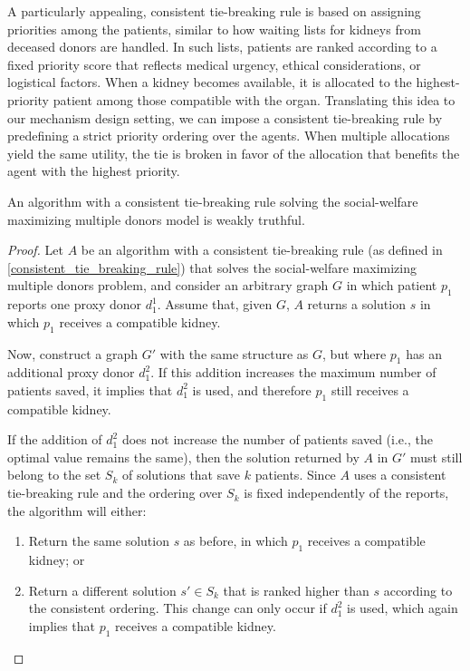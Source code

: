 A particularly appealing, consistent tie-breaking rule is based on assigning priorities among the patients, similar to how waiting lists for kidneys from deceased donors are handled. In such lists, patients are ranked according to a fixed priority score that reflects medical urgency, ethical considerations, or logistical factors. When a kidney becomes available, it is allocated to the highest-priority patient among those compatible with the organ. Translating this idea to our mechanism design setting, we can impose a consistent tie-breaking rule by predefining a strict priority ordering over the agents. When multiple allocations yield the same utility, the tie is broken in favor of the allocation that benefits the agent with the highest priority.

\begin{lemma}
    An algorithm with a consistent tie-breaking rule solving the social-welfare maximizing multiple donors model is weakly truthful.
    \begin{proof}
    Let $A$ be an algorithm with a consistent tie-breaking rule (as defined in \autoref{consistent_tie_breaking_rule}) that solves the social-welfare maximizing multiple donors problem, and consider an arbitrary graph $G$ in which patient $p_1$ reports one proxy donor $d_1^1$. Assume that, given $G$, $A$ returns a solution $s$ in which $p_1$ receives a compatible kidney.
    
    Now, construct a graph $G'$ with the same structure as $G$, but where $p_1$ has an additional proxy donor $d_1^2$. If this addition increases the maximum number of patients saved, it implies that $d_1^2$ is used, and therefore $p_1$ still receives a compatible kidney.
    
    If the addition of $d_1^2$ does not increase the number of patients saved (i.e., the optimal value remains the same), then the solution returned by $A$ in $G'$ must still belong to the set $S_k$ of solutions that save $k$ patients. Since $A$ uses a consistent tie-breaking rule and the ordering over $S_k$ is fixed independently of the reports, the algorithm will either:
    \begin{enumerate}
        \item Return the same solution $s$ as before, in which $p_1$ receives a compatible kidney; or
        \item Return a different solution $s' \in S_k$ that is ranked higher than $s$ according to the consistent ordering. This change can only occur if $d_1^2$ is used, which again implies that $p_1$ receives a compatible kidney.
    \end{enumerate}
    \end{proof}
\end{lemma}



